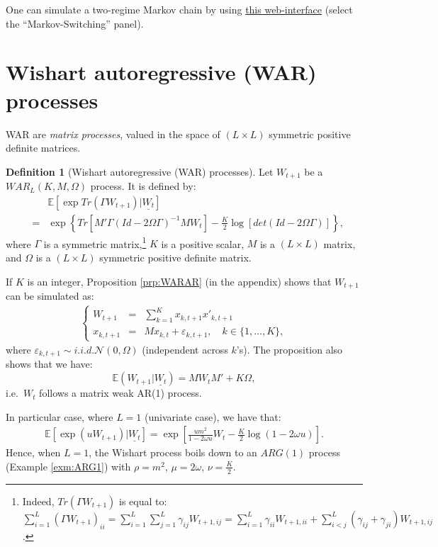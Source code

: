 \documentclass[
  12pt,
]{book}
\theoremstyle{definition}
\newtheorem{definition}{Definition}[chapter]
\theoremstyle{definition}
\theoremstyle{definition}
\theoremstyle{definition}
\theoremstyle{remark}
\begin{document}
One can simulate a two-regime Markov chain by using \href{https://jrenne.shinyapps.io/Affine/}{this web-interface} (select the ``Markov-Switching'' panel).

\hypertarget{WAR}{%
\section{Wishart autoregressive (WAR) processes}\label{WAR}}

WAR are \emph{matrix processes}, valued in the space of \((L \times L)\) symmetric positive
definite matrices.

\begin{definition}[Wishart autoregressive (WAR) processes]
\protect\hypertarget{def:WAR}{}\label{def:WAR}Let \(W_{t+1}\) be a \(WAR_L(K, M, \Omega)\) process. It is defined by:
\begin{eqnarray}
&&\mathbb{E}[\exp   Tr(\Gamma W_{t+1})|\underline{W_t}] \label{eq:Trace}\\
&=& \exp\left\{Tr[M'\Gamma(Id-2\Omega \Gamma)^{-1}M W_t]  -  \frac{K}{2}   \log [det(Id-2\Omega \Gamma)]\right\}, \nonumber
\end{eqnarray}
where \(\Gamma\) is a symmetric matrix,\footnote{Indeed, \(Tr(\Gamma W_{t+1})\) is equal to:
  \(\sum^L_{i=1}(\Gamma W_{t+1})_{ii} = \sum^L_{i=1} \sum^L_{j=1} \gamma_{ij} W_{t+1,ij} = \sum^L_{i=1} \gamma_{ii} W_{t+1,ii} + \sum^L_{i<j} (\gamma_{ij}+\gamma_{ji}) W_{t+1,ij}\).} \(K\) is a positive scalar, \(M\) is a \((L \times L)\) matrix, and \(\Omega\) is a \((L \times L)\) symmetric positive definite matrix.
\end{definition}

If \(K\) is an integer, Proposition \ref{prp:WARAR} (in the appendix) shows that \(W_{t+1}\) can be simulated as:
\begin{eqnarray*}
\left\{
\begin{array}{ccl}
W_{t+1} & =&  \sum^K_{k=1} x_{k,t+1} x'_{k,t+1}\\
x_{k,t+1} &=& M x_{k,t} + \varepsilon_{k,t+1},\quad k \in \{1,\dots,K\},
\end{array}
\right.
\end{eqnarray*}
where \(\varepsilon_{k,t+1} \sim i.i.d. \mathcal{N}(0, \Omega)\) (independent across \(k\)'s).
The proposition also shows that we have:
\[
\mathbb{E}(W_{t+1}|\underline{W_t}) = MW_tM'+K \Omega,
\]
i.e.~\(W_t\) follows a matrix weak AR(1) process.

In particular case, where \(L=1\) (univariate case), we have that:
\begin{eqnarray*}
\mathbb{E}[\exp(u W_{t+1})|\underline{W_t}] = \exp\left[
\frac{u m^2}{1-2\omega u}W_t -
\frac{K}{2}   \log(1-2\omega u)\right].
\end{eqnarray*}
Hence, when \(L=1\), the Wishart process boils down to an \(ARG(1)\) process (Example \ref{exm:ARG1}) with \(\rho = m^2\), \(\mu = 2\omega\), \(\nu = \frac{K}{2}\).
\end{document}
